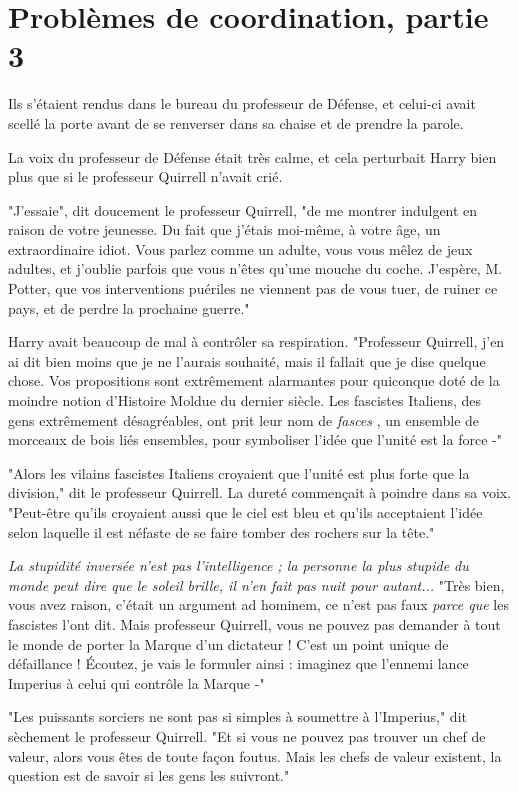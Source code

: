 
\chapter{Problèmes de coordination, partie 3}

Ils s'étaient rendus dans le bureau du professeur de Défense, et celui-ci avait scellé la porte avant de se renverser dans sa chaise et de prendre la parole.

La voix du professeur de Défense était très calme, et cela perturbait Harry bien plus que si le professeur Quirrell n'avait crié.

"J'essaie", dit doucement le professeur Quirrell, "de me montrer indulgent en raison de votre jeunesse. Du fait que j'étais moi-même, à votre âge, un extraordinaire idiot. Vous parlez comme un adulte, vous vous mêlez de jeux adultes, et j'oublie parfois que vous n'êtes qu'une mouche du coche. J'espère, M. Potter, que vos interventions puériles ne viennent pas de vous tuer, de ruiner ce pays, et de perdre la prochaine guerre."

Harry avait beaucoup de mal à contrôler sa respiration. "Professeur Quirrell, j'en ai dit bien moins que je ne l'aurais souhaité, mais il fallait que je dise quelque chose. Vos propositions sont extrêmement alarmantes pour quiconque doté de la moindre notion d'Histoire Moldue du dernier siècle. Les fascistes Italiens, des gens extrêmement désagréables, ont prit leur nom de \emph{fasces} , un ensemble de morceaux de bois liés ensembles, pour symboliser l'idée que l'unité est la force -"

"Alors les vilains fascistes Italiens croyaient que l'unité est plus forte que la division," dit le professeur Quirrell. La dureté commençait à poindre dans sa voix. "Peut-être qu'ils croyaient aussi que le ciel est bleu et qu'ils acceptaient l'idée selon laquelle il est néfaste de se faire tomber des rochers sur la tête."

\emph{La stupidité inversée n'est pas l'intelligence ; la personne la plus stupide du monde peut dire que le soleil brille, il n'en fait pas nuit pour autant...}  "Très bien, vous avez raison, c'était un argument ad hominem, ce n'est pas faux \emph{parce que}  les fascistes l'ont dit. Mais professeur Quirrell, vous ne pouvez pas demander à tout le monde de porter la Marque d'un dictateur ! C'est un point unique de défaillance ! Écoutez, je vais le formuler ainsi : imaginez que l'ennemi lance Imperius à celui qui contrôle la Marque -"

"Les puissants sorciers ne sont pas si simples à soumettre à l'Imperius," dit sèchement le professeur Quirrell. "Et si vous ne pouvez pas trouver un chef de valeur, alors vous êtes de toute façon foutus. Mais les chefs de valeur existent, la question est de savoir si les gens les suivront."

